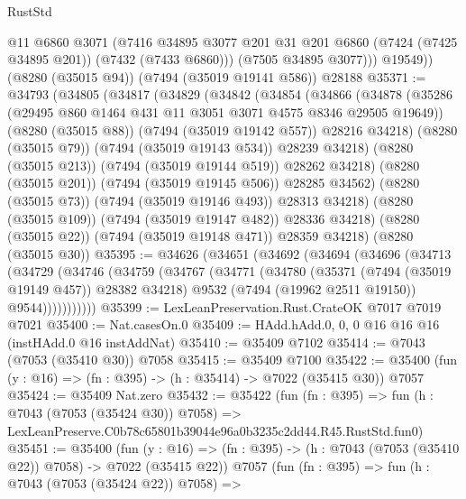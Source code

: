\begin{lexlean}{RustStd}
\begin{coremodule}
            @11
            @6860
            @3071
            (@7416
              @34895
              @3077
              @201
              @31
              @201
              @6860
              (@7424 (@7425 @34895 @201))
              (@7432 (@7433 @6860)))
            (@7505 @34895 @3077)))
        @19549))
    (@8280 (@35015 @94))
    (@7494 (@35019 @19141 @586))
    @28188
@35371 := @34793
    (@34805
      (@34817
        (@34829
          (@34842
            (@34854
              (@34866
                (@34878
                  (@35286 (@29495 @860 @1464 @431 @11 @3051 @3071 @4575 @8346 @29505 @19649))
                  (@8280 (@35015 @88))
                  (@7494 (@35019 @19142 @557))
                  @28216
                  @34218)
                (@8280 (@35015 @79))
                (@7494 (@35019 @19143 @534))
                @28239
                @34218)
              (@8280 (@35015 @213))
              (@7494 (@35019 @19144 @519))
              @28262
              @34218)
            (@8280 (@35015 @201))
            (@7494 (@35019 @19145 @506))
            @28285
            @34562)
          (@8280 (@35015 @73))
          (@7494 (@35019 @19146 @493))
          @28313
          @34218)
        (@8280 (@35015 @109))
        (@7494 (@35019 @19147 @482))
        @28336
        @34218)
      (@8280 (@35015 @22))
      (@7494 (@35019 @19148 @471))
      @28359
      @34218)
    (@8280 (@35015 @30))
@35395 := @34626
    (@34651
      (@34692
        (@34694
          (@34696
            (@34713
              (@34729
                (@34746
                  (@34759
                    (@34767
                      (@34771
                        (@34780
                          (@35371 (@7494 (@35019 @19149 @457)) @28382 @34218)
                          @9532
                          (@7494 (@19962 @2511 @19150))
                          @9544)))))))))))
@35399 := LexLeanPreservation.Rust.CrateOK @7017 @7019 @7021
@35400 := Nat.casesOn.{0}
@35409 := HAdd.hAdd.{0, 0, 0} @16 @16 @16 (instHAdd.{0} @16 instAddNat)
@35410 := @35409 @7102
@35414 := @7043 (@7053 (@35410 @30)) @7058
@35415 := @35409 @7100
@35422 := @35400 (fun (y : @16) => (fn : @395) -> (h : @35414) -> @7022 (@35415 @30)) @7057
@35424 := @35409 Nat.zero
@35432 := @35422
    (fun (fn : @395) =>
    fun (h : @7043 (@7053 (@35424 @30)) @7058) =>
    LexLeanPreserve.C0b78c65801b39044e96a0b3235c2dd44.R45.RustStd.fun0)
@35451 := @35400
    (fun (y : @16) => (fn : @395) -> (h : @7043 (@7053 (@35410 @22)) @7058) -> @7022 (@35415 @22))
    @7057
    (fun (fn : @395) =>
    fun (h : @7043 (@7053 (@35424 @22)) @7058) =>

\end{coremodule}
\end{lexlean}
